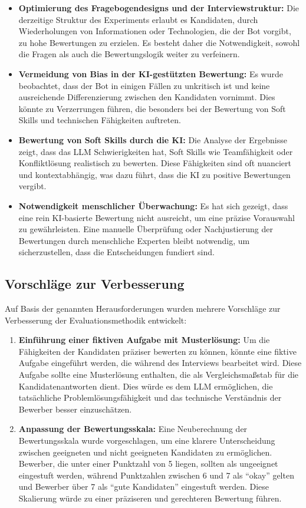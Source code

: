 \begin{itemize}
    \item \textbf{Optimierung des Fragebogendesigns und der Interviewstruktur:} Die derzeitige Struktur des Experiments erlaubt es Kandidaten, durch Wiederholungen von Informationen oder Technologien, die der Bot vorgibt, zu hohe Bewertungen zu erzielen. Es besteht daher die Notwendigkeit, sowohl die Fragen als auch die Bewertungslogik weiter zu verfeinern.
    \item \textbf{Vermeidung von Bias in der KI-gestützten Bewertung:} Es wurde beobachtet, dass der Bot in einigen Fällen zu unkritisch ist und keine ausreichende Differenzierung zwischen den Kandidaten vornimmt. Dies könnte zu Verzerrungen führen, die besonders bei der Bewertung von Soft Skills und technischen Fähigkeiten auftreten.
    \item \textbf{Bewertung von Soft Skills durch die KI:} Die Analyse der Ergebnisse zeigt, dass das LLM Schwierigkeiten hat, Soft Skills wie Teamfähigkeit oder Konfliktlösung realistisch zu bewerten. Diese Fähigkeiten sind oft nuanciert und kontextabhängig, was dazu führt, dass die KI zu positive Bewertungen vergibt.
    \item \textbf{Notwendigkeit menschlicher Überwachung:} Es hat sich gezeigt, dass eine rein KI-basierte Bewertung nicht ausreicht, um eine präzise Vorauswahl zu gewährleisten. Eine manuelle Überprüfung oder Nachjustierung der Bewertungen durch menschliche Experten bleibt notwendig, um sicherzustellen, dass die Entscheidungen fundiert sind.
\end{itemize}

\subsection{Vorschläge zur Verbesserung}

Auf Basis der genannten Herausforderungen wurden mehrere Vorschläge zur Verbesserung der Evaluationsmethodik entwickelt:

\begin{enumerate}
    \item \textbf{Einführung einer fiktiven Aufgabe mit Musterlösung:} Um die Fähigkeiten der Kandidaten präziser bewerten zu können, könnte eine fiktive Aufgabe eingeführt werden, die während des Interviews bearbeitet wird. Diese Aufgabe sollte eine Musterlösung enthalten, die als Vergleichsmaßstab für die Kandidatenantworten dient. Dies würde es dem LLM ermöglichen, die tatsächliche Problemlösungsfähigkeit und das technische Verständnis der Bewerber besser einzuschätzen.
    \item \textbf{Anpassung der Bewertungsskala:} Eine Neuberechnung der Bewertungsskala wurde vorgeschlagen, um eine klarere Unterscheidung zwischen geeigneten und nicht geeigneten Kandidaten zu ermöglichen. Bewerber, die unter einer Punktzahl von 5 liegen, sollten als ungeeignet eingestuft werden, während Punktzahlen zwischen 6 und 7 als \enquote{okay} gelten und Bewerber über 7 als \enquote{gute Kandidaten} eingestuft werden. Diese Skalierung würde zu einer präziseren und gerechteren Bewertung führen.
\end{enumerate}

